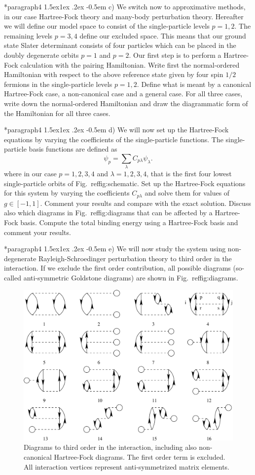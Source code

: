 \documentclass[%
twoside,                 %
final,                   %
10pt]{article}
\makeatletter
\newenvironment{doconceexercise}{}{}
\newcommand\subex{\@startsection*{paragraph}{4}{\z@}%
                  {1.5ex\@plus1ex \@minus.2ex}%
                  {-0.5em}%
                  {\normalfont\normalsize\bfseries}}
\makeatother
\begin{document}
\begin{doconceexercise}
\subex{c)}
We switch now to approximative methods, in our case Hartree-Fock
  theory and many-body perturbation theory. Hereafter we will define
  our model space to consist of the single-particle levels $p=1,2$.
  The remaining levels $p=3,4$ define our excluded space.  This means
  that our ground state Slater determinant consists of four particles
  which can be placed in the doubly degenerate orbits $p=1$ and $p=2$.
  Our first step is to perform a Hartree-Fock calculation with the
  pairing Hamiltonian.  Write first the normal-ordered Hamiltonian
  with respect to the above reference state given by four spin $1/2$
  fermions in the single-particle levels $p=1,2$. Define what is meant
  by a canonical Hartree-Fock case, a non-canonical case and a general
  case.  For all three cases, write down the normal-ordered
  Hamiltonian and draw the diagrammatic form of the Hamiltonian for all three cases.



\subex{d)}
We will now set up the Hartree-Fock equations by varying the
coefficients of the single-particle functions. The single-particle
basis functions are defined as
\[
\psi_p = \sum_{\lambda} C_{p\lambda}\psi_{\lambda}.
\]
where in our case $p=1,2,3,4$ and $\lambda=1,2,3,4$, that is the first
four lowest single-particle orbits of Fig.~ref{fig:schematic}.  Set
up the Hartree-Fock equations for this system by varying the
coefficients $C_{p\lambda}$ and solve them for values of $g\in
[-1,1]$.  Comment your results and compare with the exact
solution. Discuss also which diagrams in Fig.~ref{fig:diagrams} that
can be affected by a Hartree-Fock basis. Compute the total binding
energy using a Hartree-Fock basis and comment your results.



\subex{e)}
We will now study the system using non-degenerate
Rayleigh-Schroedinger perturbation theory to third order in the
interaction.  If we exclude the first order contribution, all possible
diagrams (so-called anti-symmetric Goldstone diagrams) are
shown in Fig.~ref{fig:diagrams}.


\begin{figure}[t]
  \centerline{\includegraphics[width=0.6\linewidth]{fig-proj/diagrams.pdf}}
  \caption{
  Diagrams to third order in the interaction, including also non-canonical Hartree-Fock diagrams. The first order term is excluded. All interaction vertices represent anti-symmetrized matrix elements. \label{fig:diagrams}
  }
\end{figure}



\end{doconceexercise}
\end{document}
